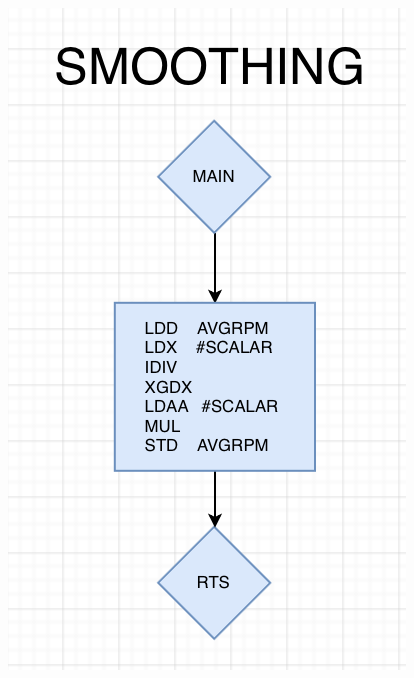 \documentclass[12pt]{report}
\begin{document}
\begin{center}
     \includegraphics[scale=0.66]{smoothing.PNG}\\

\end{center}
\end{document}
